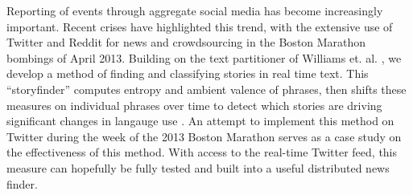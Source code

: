 Reporting of events through aggregate social media has become
increasingly important.
Recent crises have highlighted this trend, with the extensive use of
Twitter and Reddit for news and crowdsourcing in the Boston Marathon
bombings of April 2013.
Building on the text partitioner of Williams
et. al. \cite{williams-partitioner}, we develop a method of finding
and classifying stories in real time text.
This ``storyfinder'' computes entropy and ambient valence of phrases,
then shifts these measures on individual phrases over time to detect
which stories are driving significant changes in langauge use
\cite{desu-ambient}.
An attempt to implement this method on Twitter during the week of the
2013 Boston Marathon serves as a case study on the effectiveness of
this method.
With access to the real-time Twitter feed, this measure can hopefully
be fully tested and built into a useful  distributed news finder.
